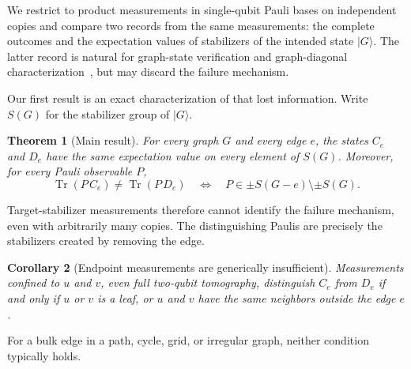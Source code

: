 \documentclass[11pt]{article}
\newtheorem{theorem}{Theorem}[section]
\newtheorem{corollary}[theorem]{Corollary}
\theoremstyle{remark}
\newcommand{\Tr}{\operatorname{Tr}}
\begin{document}
We restrict to product measurements in single-qubit Pauli bases on independent copies and compare two records from the same measurements: the complete outcomes and the expectation values of stabilizers of the intended state \(|G\rangle\).  The latter record is natural for graph-state verification and graph-diagonal characterization~\cite{WangEtAl25}, but may discard the failure mechanism.

Our first result is an exact characterization of that lost information.  Write \(S(G)\) for the stabilizer group of \(|G\rangle\).

\begin{theorem}[Main result]\label{thm:intro-main}
For every graph \(G\) and every edge \(e\), the states \(C_e\) and \(D_e\) have the same expectation value on every element of \(S(G)\).  Moreover, for every Pauli observable \(P\),
\[
  \Tr(P\,C_e)\ne\Tr(P\,D_e)
  \quad\Longleftrightarrow\quad
  P\in\pm S(G-e)\setminus\pm S(G).
\]
\end{theorem}

Target-stabilizer measurements therefore cannot identify the failure mechanism, even with arbitrarily many copies.  The distinguishing Paulis are precisely the stabilizers created by removing the edge.

\begin{corollary}[Endpoint measurements are generically insufficient]\label{cor:intro-endpoint}
Measurements confined to \(u\) and \(v\), even full two-qubit tomography, distinguish \(C_e\) from \(D_e\) if and only if \(u\) or \(v\) is a leaf, or \(u\) and \(v\) have the same neighbors outside the edge \(e\).
\end{corollary}

For a bulk edge in a path, cycle, grid, or irregular graph, neither condition typically holds.
\end{document}
